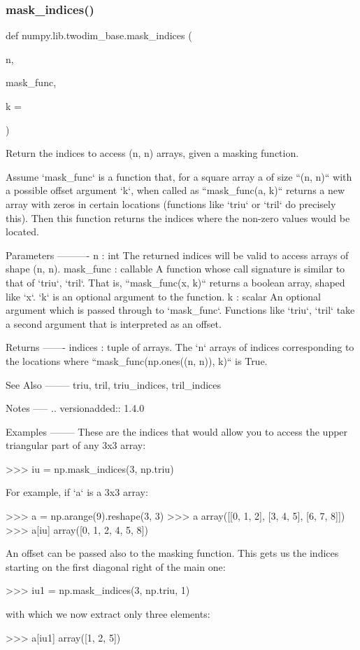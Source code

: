 \subsubsection{\texorpdfstring{mask\+\_\+indices()}{mask\_indices()}}
{\footnotesize\ttfamily def numpy.\+lib.\+twodim\+\_\+base.\+mask\+\_\+indices (\begin{DoxyParamCaption}\item[{}]{n,  }\item[{}]{mask\+\_\+func,  }\item[{}]{k = {} }\end{DoxyParamCaption})}

\begin{DoxyVerb}Return the indices to access (n, n) arrays, given a masking function.

Assume `mask_func` is a function that, for a square array a of size
``(n, n)`` with a possible offset argument `k`, when called as
``mask_func(a, k)`` returns a new array with zeros in certain locations
(functions like `triu` or `tril` do precisely this). Then this function
returns the indices where the non-zero values would be located.

Parameters
----------
n : int
    The returned indices will be valid to access arrays of shape (n, n).
mask_func : callable
    A function whose call signature is similar to that of `triu`, `tril`.
    That is, ``mask_func(x, k)`` returns a boolean array, shaped like `x`.
    `k` is an optional argument to the function.
k : scalar
    An optional argument which is passed through to `mask_func`. Functions
    like `triu`, `tril` take a second argument that is interpreted as an
    offset.

Returns
-------
indices : tuple of arrays.
    The `n` arrays of indices corresponding to the locations where
    ``mask_func(np.ones((n, n)), k)`` is True.

See Also
--------
triu, tril, triu_indices, tril_indices

Notes
-----
.. versionadded:: 1.4.0

Examples
--------
These are the indices that would allow you to access the upper triangular
part of any 3x3 array:

>>> iu = np.mask_indices(3, np.triu)

For example, if `a` is a 3x3 array:

>>> a = np.arange(9).reshape(3, 3)
>>> a
array([[0, 1, 2],
       [3, 4, 5],
       [6, 7, 8]])
>>> a[iu]
array([0, 1, 2, 4, 5, 8])

An offset can be passed also to the masking function.  This gets us the
indices starting on the first diagonal right of the main one:

>>> iu1 = np.mask_indices(3, np.triu, 1)

with which we now extract only three elements:

>>> a[iu1]
array([1, 2, 5])\end{DoxyVerb}
 \mbox{\label{namespacenumpy_1_1lib_1_1twodim__base_a5e4ae28b8ab99d6def80add7515108ff}} 
